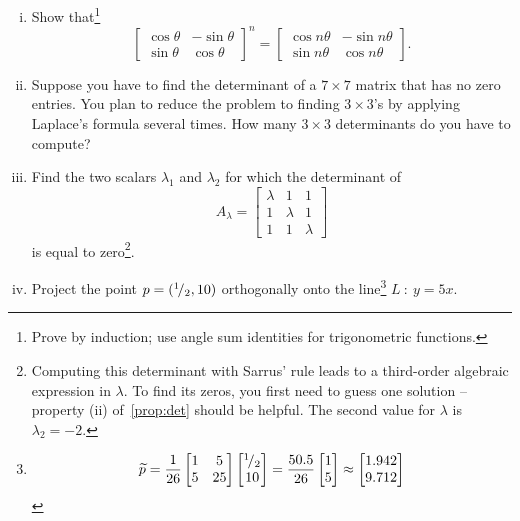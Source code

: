 \begin{exercise}
\begin{enumerate}[(i)]
	Consider
	\[ A = \begin{bmatrix} 1 & 0 \\ -1 & 0	\end{bmatrix}. \]
	For which $2 \times 2$ matrices $X$ do we have\footnote{Matrices of the form
		\[ X = \begin{bmatrix} a & 0 \\ b & a+b \end{bmatrix}, \]
		where $a,b\in\mathbb{R}$, commute with $A$.} $AX=XA$ ?
	\item Show that\footnote{Prove by induction; use angle sum identities for trigonometric functions.}
	\[ \begin{bmatrix} \cos \theta & - \sin \theta \\ \sin \theta & \cos \theta \end{bmatrix}^n
	= \begin{bmatrix} \cos n\theta & - \sin n\theta \\ \sin n\theta & \cos n\theta \end{bmatrix}. \]
	\item Suppose you have to find the determinant of a $7 \times 7$ matrix that has no zero entries. You plan to reduce the problem to finding $3 \times 3$'s by applying Laplace's formula several times. How many $3 \times 3$ determinants do you have to compute?
	\item Find the two scalars $\lambda_1$ and $\lambda_2$ for which the determinant of 
	\[ A_{\lambda} = \begin{bmatrix}
	\lambda & 1 & 1 \\ 1 & \lambda & 1 \\ 1 & 1 & \lambda
	\end{bmatrix} \]
	is equal to zero\footnote{Computing this determinant with Sarrus' rule leads to a third-order algebraic expression in $\lambda$. To find its zeros, you first need to guess one solution -- property (ii) of~\ref{prop:det} should be helpful. The second value for $\lambda$ is $\lambda_2=-2$.}.
	\item Project the point $p=({}^{1}\!/_{2},10)$ orthogonally onto the line\footnote{
	\[  \widetilde{p} = \frac{1}{26}
	\begin{bmatrix} 1 & 5 \\ 5 & 25 \end{bmatrix} \begin{bmatrix} {}^{1}\!/_{2} \\ 10 \end{bmatrix}
	= \frac{50.5}{26}\begin{bmatrix} 1 \\ 5 \end{bmatrix}
	\approx \begin{bmatrix} 1.942 \\ 9.712 \end{bmatrix} \]}
	$L \: : \: y=5x$.
\end{enumerate}
\end{exercise}


